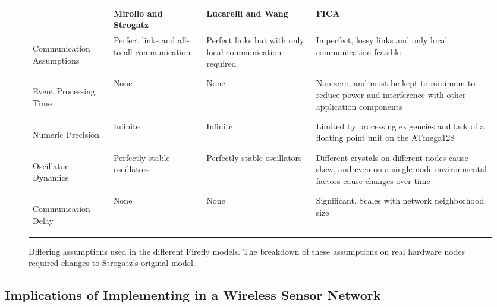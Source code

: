 \begin{figure}[t]
\begin{center}
\begin{tabular}{|p{5cm}|p{3cm}|p{3cm}|p{3cm}|} 
\hline
& {\bf Mirollo and Strogatz} & {\bf Lucarelli and Wang} & {\bf FICA} 
\\ \hline
  {\em \begin{center} Communication Assumptions \end{center}} & 
  {Perfect links and all-to-all communication} & 
  {Perfect links but with only local communication required} &
  {Imperfect, lossy links and only local communication feasible}
\\ \hline
  {\em \begin{center} Event Processing Time \end{center}} &
  {None} &
  {None} &
  {Non-zero, and must be kept to minimum to reduce power and interference
  with other application components}
\\ \hline
  {\em \begin{center} Numeric Precision \end{center}} &
  {Infinite} &
  {Infinite} &
  {Limited by processing exigencies and lack of a floating point unit on the
  ATmega128}
\\ \hline
  {\em \begin{center} Oscillator Dynamics \end{center}} &
  {Perfectly stable oscillators} &
  {Perfectly stable oscillators} &
  {Different crystals on different nodes cause skew, and even on a single
  node environmental factors cause changes over time}
\\ \hline
  {\em \begin{center} Communication Delay \end{center}} &
  {None} &
  {None} &
  {Significant.  Scales with network neighborhood size}
\\ \hline
\end{tabular}
\end{center}
\caption{\small {Differing assumptions used in the different Firefly models.
The breakdown of these assumptions on real hardware nodes required changes to
Strogatz's original model.}}
\label{fig-challenges}
\end{figure}

\subsection{Implications of Implementing in a Wireless Sensor Network}

